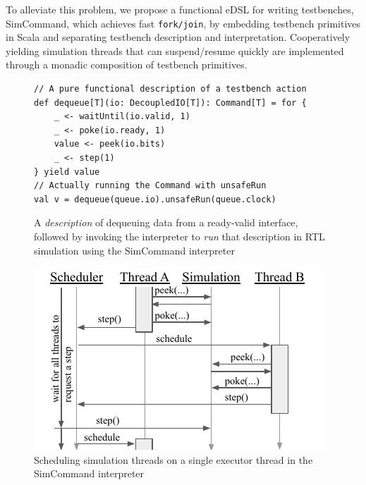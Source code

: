 \documentclass[sigplan,review,nonacm,9pt]{acmart}
\begin{document}


To alleviate this problem, we propose a functional eDSL for writing testbenches, SimCommand\cite{simcommand}, which achieves fast \texttt{fork/join}, by embedding testbench primitives in Scala and separating testbench description and interpretation.
Cooperatively yielding simulation threads that can suspend/resume quickly are implemented through a monadic composition of testbench primitives\cite{hardcaml_step_testbench}.

\begin{figure}
\begin{verbatim}
// A pure functional description of a testbench action
def dequeue[T](io: DecoupledIO[T]): Command[T] = for {
    _ <- waitUntil(io.valid, 1)
    _ <- poke(io.ready, 1)
    value <- peek(io.bits)
    _ <- step(1)
} yield value
// Actually running the Command with unsafeRun
val v = dequeue(queue.io).unsafeRun(queue.clock)
\end{verbatim}
\caption{A \textit{description} of dequeuing data from a ready-valid interface, followed by invoking the interpreter to \textit{run} that description in RTL simulation using the SimCommand interpreter}
\label{fig:simcommand}
\end{figure}

\begin{figure}
\includegraphics[scale=1]{simcommand/scheduler.pdf}
\caption{Scheduling simulation threads on a single executor thread in the SimCommand interpreter}
\label{fig:simcommand_interp}
\end{figure}
\end{document}
